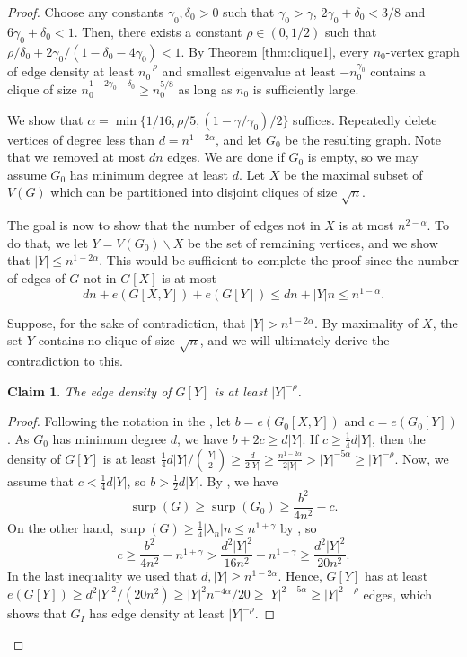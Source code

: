 \documentclass[11pt]{article}
\theoremstyle{plain}
\newtheorem{claim}[theorem]{Claim}
\theoremstyle{definition}
\DeclareMathOperator{\surp}{surp}
\begin{document}
\begin{proof}
Choose any constants $\gamma_0,\delta_0>0$ such that $\gamma_0>\gamma$, $2\gamma_0+\delta_0<3/8$ and $6\gamma_0+\delta_0 < 1$. 
Then, there exists a constant $\rho \in (0,1/2)$ such that $\rho/\delta_0+2\gamma_0/(1-\delta_0-4\gamma_0) < 1$.
By Theorem \ref{thm:clique1}, every $n_0$-vertex graph of edge density at least $n_0^{-\rho}$ and smallest eigenvalue at least $-n_0^{\gamma_0}$ contains a clique of size $n_0^{1-2\gamma_0-\delta_0}\ge n_0^{5/8}$ as long as $n_0$ is sufficiently large.

We show that $\alpha=\min\{1/16,\rho/5,(1-\gamma/\gamma_0)/2\}$ suffices. 
Repeatedly delete vertices of degree less than $d=n^{1-2\alpha}$, and let $G_0$ be the resulting graph.
Note that we removed at most $dn$ edges. 
We are done if $G_0$ is empty, so we may assume $G_0$ has minimum degree at least $d$.
Let $X$ be the maximal subset of $V(G)$ which can be partitioned into disjoint cliques of size $\sqrt{n}$. 

The goal is now to show that the number of edges not in $X$ is at most $n^{2-\alpha}$. To do that, we let $Y=V(G_0)\backslash X$ be the set of remaining vertices, and we show that $|Y| \le n^{1-2\alpha}$. This would be sufficient to complete the proof since the number of edges of $G$ not in $G[X]$ is at most 
$$dn+e(G[X,Y])+e(G[Y])\leq dn+|Y|n\leq n^{1-\alpha}.$$

Suppose, for the sake of contradiction, that $|Y|> n^{1-2\alpha}$. 
By maximality of $X$, the set $Y$ contains no clique of size $\sqrt{n}$, and we will ultimately derive the contradiction to this.

\begin{claim}
The edge density of $G[Y]$ is at least $|Y|^{-\rho}$.
\end{claim}
\begin{proof}
    Following the notation in the , let $b=e(G_0[X,Y])$ and $c=e(G_0[Y])$.
    As $G_0$ has minimum degree $d$, we have $b+2c\geq d|Y|$. 
    If $c \ge \frac{1}{4}d|Y|$, then the density of $G[Y]$ is at least $\frac{1}{4}d|Y|/\binom{|Y|}{2} \ge \frac{d}{2|Y|}\ge\frac{n^{1-2\alpha}}{2|Y|}>|Y|^{-5\alpha}\ge |Y|^{-\rho}$.
    Now, we assume that $c < \frac{1}{4}d|Y|$, so $b > \frac{1}{2}d|Y|$.
    By , we have
    $$\surp(G)\geq \surp(G_0)\geq \frac{b^2}{4n^2}-c.$$
    On the other hand, $\surp(G)\ge \frac{1}{4}|\lambda_n|n \leq n^{1+\gamma}$ by , so     
    $$c\geq \frac{b^2}{4n^2}-n^{1+\gamma}> \frac{d^2|Y|^2}{16n^2}-n^{1+\gamma}\geq \frac{d^2|Y|^2}{20n^2}.$$
    In the last inequality we used that $d, |Y|\geq n^{1-2\alpha}$.
    Hence, $G[Y]$ has at least $e(G[Y])\geq d^2|Y|^2/(20n^2)\ge |Y|^2n^{-4\alpha}/20\geq |Y|^{2-5\alpha} \ge |Y|^{2-\rho}$ edges, which shows that $G_I$ has edge density at least $|Y|^{-\rho}$. 
\end{proof}



\end{proof}
\end{document}
